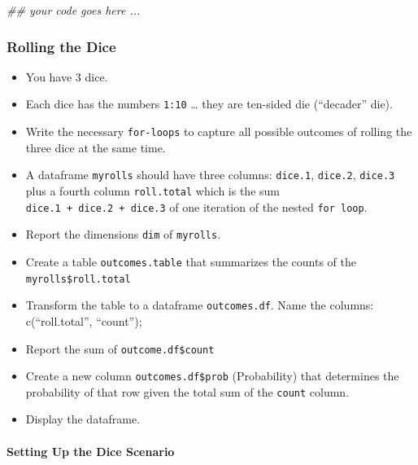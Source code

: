 \documentclass[
]{article}
\newenvironment{Shaded}{\begin{snugshade}}{\end{snugshade}}
\newcommand{\CommentTok}[1]{\textcolor[rgb]{0.56,0.35,0.01}{\textit{#1}}}
\providecommand{\tightlist}{%
  \setlength{\itemsep}{0pt}\setlength{\parskip}{0pt}}
\begin{document}
\begin{Shaded}
\begin{Highlighting}[]
\CommentTok{\#\# your code goes here ...}
\end{Highlighting}
\end{Shaded}

\hypertarget{rolling-the-dice}{%
\subsubsection{Rolling the Dice}\label{rolling-the-dice}}

\begin{itemize}
\tightlist
\item
  You have 3 dice.
\item
  Each dice has the numbers \texttt{1:10} \ldots{} they are ten-sided
  die (``decader'' die).
\item
  Write the necessary \texttt{for-loops} to capture all possible
  outcomes of rolling the three dice at the same time.
\item
  A dataframe \texttt{myrolls} should have three columns:
  \texttt{dice.1}, \texttt{dice.2}, \texttt{dice.3} plus a fourth column
  \texttt{roll.total} which is the sum
  \texttt{dice.1\ +\ dice.2\ +\ dice.3} of one iteration of the nested
  \texttt{for\ loop}.
\item
  Report the dimensions \texttt{dim} of \texttt{myrolls}.
\item
  Create a table \texttt{outcomes.table} that summarizes the counts of
  the \texttt{myrolls\$roll.total}
\item
  Transform the table to a dataframe \texttt{outcomes.df}. Name the
  columns: c(``roll.total'', ``count'');
\item
  Report the sum of \texttt{outcome.df\$count}
\item
  Create a new column \texttt{outcomes.df\$prob} (Probability) that
  determines the probability of that row given the total sum of the
  \texttt{count} column.
\item
  Display the dataframe.
\end{itemize}

\hypertarget{setting-up-the-dice-scenario}{%
\paragraph{Setting Up the Dice
Scenario}\label{setting-up-the-dice-scenario}}
\end{document}
